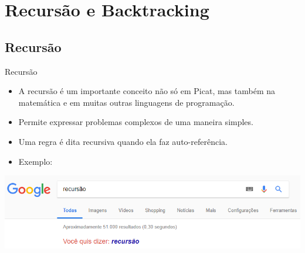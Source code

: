 
\section{Recursão e Backtracking}
\subsection{Recursão}
\begin{frame}{Recursão}
    \begin{itemize}

        \item A recursão é um importante conceito não só em Picat, mas também na matemática e em muitas outras linguagens
        de programação.

        \item Permite expressar problemas complexos de uma maneira simples.
        
        \item Uma regra é dita recursiva quando ela faz auto-referência.
        
        \item Exemplo:

    \end{itemize}
    
    \pause
    
    \centering
    \includegraphics[scale=0.5]{figures/Recursao.png}
    
\end{frame}


